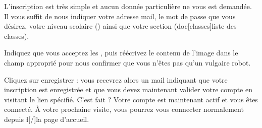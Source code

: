 ﻿L'inscription est très simple et aucun donnée particulière ne vous est demandée. Il vous suffit de nous indiquer votre adresse mail, le mot de passe que vous désirez, votre niveau scolaire () ainsi que votre section (doc[classes]{liste des classes}).

Indiquez que vous acceptez les , puis réécrivez le contenu de l'image dans le champ approprié pour nous confirmer que vous n'êtes pas qu'un vulgaire robot.

Cliquez sur enregistrer : vous recevrez alors un mail indiquant que votre inscription est enregistrée et que vous devez maintenant valider votre compte en visitant le lien spécifié.
C'est fait ? Votre compte est maintenant actif et vous êtes connecté. À votre prochaine visite, vous pourrez vous connecter normalement depuis \l[/]{la page d'accueil}.
